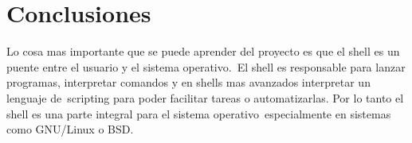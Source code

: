 \section{Conclusiones}
Lo cosa mas importante que se puede aprender del proyecto es que el shell es un puente entre el usuario y el sistema operativo.\
El shell es responsable para lanzar programas, interpretar comandos y en shells mas avanzados interpretar un lenguaje de\
scripting para poder facilitar tareas o automatizarlas. Por lo tanto el shell es una parte integral para el sistema operativo\
especialmente en sistemas como GNU/Linux o BSD.